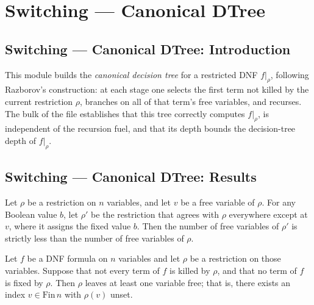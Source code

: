 \section{Switching --- Canonical DTree}
\subsection*{Switching --- Canonical DTree: Introduction}

This module builds the \emph{canonical decision tree} for a restricted DNF $f|_\rho$,
following Razborov's construction: at each stage one selects the first term not killed
by the current restriction $\rho$, branches on all of that term's free variables, and
recurses. The bulk of the file establishes that this tree correctly computes $f|_\rho$,
is independent of the recursion fuel, and that its depth bounds the decision-tree depth
of $f|_\rho$.

\subsection*{Switching --- Canonical DTree: Results}

\begin{lemma}
\label{SwitchingLemma.numFree_update_lt}
\leanok
{}
Let $\rho$ be a restriction on $n$ variables, and let $v$ be a free variable of $\rho$.
For any Boolean value $b$, let $\rho'$ be the restriction that agrees with $\rho$
everywhere except at $v$, where it assigns the fixed value $b$. Then the number of free
variables of $\rho'$ is strictly less than the number of free variables of $\rho$.
\end{lemma}

\begin{lemma}
\label{SwitchingLemma.exists_free_of_not_killed_not_fixed}
\leanok
{}
Let $f$ be a DNF formula on $n$ variables and let $\rho$ be a restriction on those
variables. Suppose that not every term of $f$ is killed by $\rho$, and that no term of
$f$ is fixed by $\rho$. Then $\rho$ leaves at least one variable free; that is, there
exists an index $v \in \mathrm{Fin}\,n$ with $\rho(v)$ unset.
\end{lemma}

